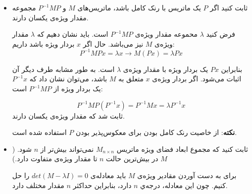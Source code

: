 \begin{itemize}
	\item ثابت کنید اگر $P$ یک ماتریس با رنک کامل باشد، ماتریس‌های $M$ و $P^{-1}MP$ مجموعه مقدار ویژه‌ی یکسان دارند.
	
	فرض کنید $\lambda$ محموعه مقدار ویژه‌ی $P^{-1}MP$ است. باید نشان دهیم که $\lambda$ مقدار ویژه‌ی $M$ نیز می‌باشد. حال اگر $x$ بردار ویژه باشد داریم:
	$$P^{-1}MPx = \lambda x \rightarrow M(Px) = \lambda Px$$
	
	بنابراین $Px$ یک بردار ویژه با مقدار ویژه‌ی $\lambda$ است. 
	به طور مشابه طرف دیگر آن اثبات می‌شود. اگر بردار ویژه‌ی $x$ متعلق به $M$ باشد، می‌توان نشان داد که $P^{-1}x$ یک بردار ویژه از $P^{-1}MP$ است:
	
	$$P^{-1}MP(P^{-1}x) = P^{-1}Mx = \lambda P^{-1}x$$
	ثابت شد که مقدار ویژه‌ی یکسان دارند. 
	
\textbf{نکته}: 
از خاصیت رنک کامل بودن برای معکوس‌پذیر بودن $P$ استفاده شده است.
\item ثابت کنید که مجموع ابعاد فضای ویژه ماتریس $M_{n\times n}$ نمی‌تواند بیش‌تر از $n$ شود. ($M$ در بیش‌ترین حالت $n$ تا مقدار ویژه‌ی متفاوت دارد.)

برای به ‌دست آوردن مقادیر ویژه‌ی $M$ باید معادله‌ی
 $det(M - \lambda I )= 0$
 را حل کنیم. چون این معادله، درجه‌ي $n$ دارد، بنابراین حداکثر $n$ مقدار مختلف دارد. 
\end{itemize}